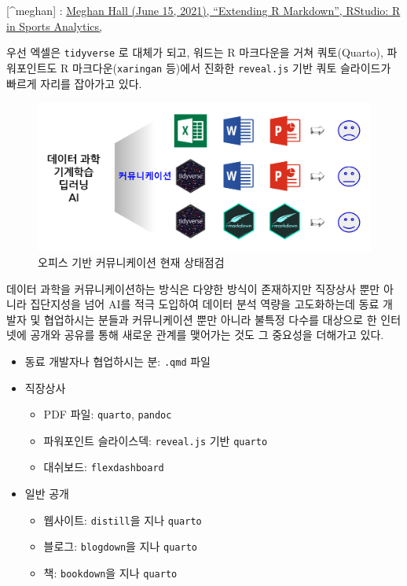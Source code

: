 \documentclass[
  letterpaper,
  chapter,a4paper,showtrims,openright,hidelinks]{oblivoir}
\providecommand{\tightlist}{%
  \setlength{\itemsep}{0pt}\setlength{\parskip}{0pt}}\usepackage{longtable,booktabs,array}
\begin{document}
{[}\^{}meghan{]} :
\href{https://meghan.rbind.io/slides/rstudio/hall_rstudio_2021}{Meghan
Hall (June 15, 2021), ``Extending R Markdown'', RStudio: R in Sports
Analytics,}

우선 엑셀은 \texttt{tidyverse} 로 대체가 되고, 워드는 R 마크다운을 거쳐
쿼토(Quarto), 파워포인트도 R 마크다운(\texttt{xaringan} 등)에서 진화한
\texttt{reveal.js} 기반 쿼토 슬라이드가 빠르게 자리를 잡아가고 있다.

\begin{figure}

{\centering \includegraphics{images/nightingale_office.png}

}

\caption{오피스 기반 커뮤니케이션 현재 상태점검}

\end{figure}

데이터 과학을 커뮤니케이션하는 방식은 다양한 방식이 존재하지만 직장상사
뿐만 아니라 집단지성을 넘어 AI를 적극 도입하여 데이터 분석 역량을
고도화하는데 동료 개발자 및 협업하시는 분들과 커뮤니케이션 뿐만 아니라
불특정 다수를 대상으로 한 인터넷에 공개와 공유를 통해 새로운 관계를
맺어가는 것도 그 중요성을 더해가고 있다.

\begin{itemize}
\tightlist
\item
  동료 개발자나 협업하시는 분: \texttt{.qmd} 파일
\item
  직장상사

  \begin{itemize}
  \tightlist
  \item
    PDF 파일: \texttt{quarto}, \texttt{pandoc}
  \item
    파워포인트 슬라이스덱: \texttt{reveal.js} 기반 \texttt{quarto}
  \item
    대쉬보드: \texttt{flexdashboard}
  \end{itemize}
\item
  일반 공개

  \begin{itemize}
  \tightlist
  \item
    웹사이트: \texttt{distill}을 지나 \texttt{quarto}
  \item
    블로그: \texttt{blogdown}을 지나 \texttt{quarto}
  \item
    책: \texttt{bookdown}을 지나 \texttt{quarto}
  \end{itemize}
\end{itemize}
\end{document}
